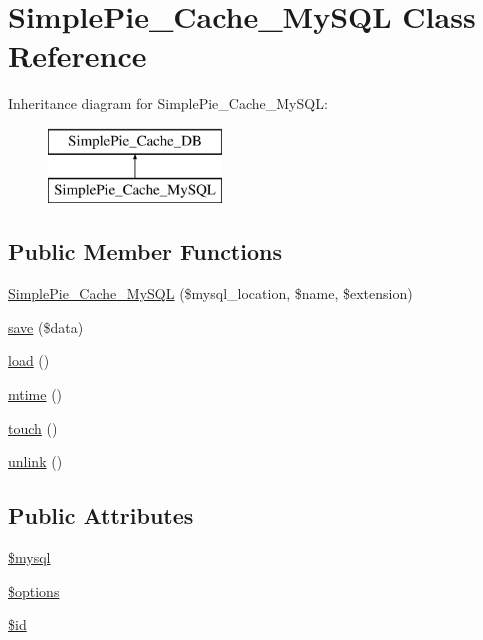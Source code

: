 \hypertarget{class_simple_pie___cache___my_s_q_l}{\section{Simple\-Pie\-\_\-\-Cache\-\_\-\-My\-S\-Q\-L Class Reference}
\label{class_simple_pie___cache___my_s_q_l}
}
Inheritance diagram for Simple\-Pie\-\_\-\-Cache\-\_\-\-My\-S\-Q\-L\-:\begin{figure}[H]
\begin{center}
\leavevmode
\includegraphics[height=2.000000cm]{class_simple_pie___cache___my_s_q_l}
\end{center}
\end{figure}
\subsection*{Public Member Functions}
\begin{DoxyCompactItemize}
\item 
\hyperlink{class_simple_pie___cache___my_s_q_l_a1750489a0e835910756bb5c90e8a2568}{Simple\-Pie\-\_\-\-Cache\-\_\-\-My\-S\-Q\-L} (\$mysql\-\_\-location, \$name, \$extension)
\item 
\hyperlink{class_simple_pie___cache___my_s_q_l_a866efc6e8643b84e75e07b2bdd067b3b}{save} (\$data)
\item 
\hyperlink{class_simple_pie___cache___my_s_q_l_ae08532e99729ec0d78fc935b05cbb5f1}{load} ()
\item 
\hyperlink{class_simple_pie___cache___my_s_q_l_a7a5cb982ac425745d0da8858e80ee946}{mtime} ()
\item 
\hyperlink{class_simple_pie___cache___my_s_q_l_a00748711eda1ad19f601167f6313ca73}{touch} ()
\item 
\hyperlink{class_simple_pie___cache___my_s_q_l_ae90ca5817951411a8b99edb875119ac8}{unlink} ()
\end{DoxyCompactItemize}
\subsection*{Public Attributes}
\begin{DoxyCompactItemize}
\item 
\hyperlink{class_simple_pie___cache___my_s_q_l_aa9feba9dea34df69d40a0ab1ad4bc65f}{\$mysql}
\item 
\hyperlink{class_simple_pie___cache___my_s_q_l_a2a435924756a07664a16c0ba2293066e}{\$options}
\item 
\hyperlink{class_simple_pie___cache___my_s_q_l_a47fa03a8e70bcc766a06ef7edc30862e}{\$id}
\end{DoxyCompactItemize}


